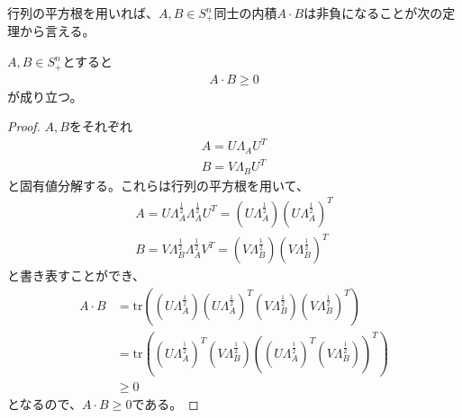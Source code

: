 行列の平方根を用いれば、$A, B \in S_+^n$同士の内積$A \cdot B$は非負になることが次の定理から言える。
\begin{theorem} \label{SemidefiniteInnerProduct}
  $A, B \in S_+^n$とすると
  \begin{align*}
    A \cdot B \geq 0
  \end{align*}
  が成り立つ。
\end{theorem}
\begin{proof}
  $A, B$をそれぞれ
  \begin{align*}
    A = U \Lambda_A U^T \\
    B = V \Lambda_B U^T
  \end{align*}
  と固有値分解する。これらは行列の平方根を用いて、
  \begin{align*}
    A = U \Lambda_A^\frac{1}{2} \Lambda_A^\frac{1}{2} U^T = \left(U \Lambda_A^\frac{1}{2}\right) \left(U \Lambda_A^\frac{1}{2}\right)^T\\
    B = V \Lambda_B^\frac{1}{2} \Lambda_A^\frac{1}{2} V^T = \left(V \Lambda_B^\frac{1}{2}\right) \left(V \Lambda_B^\frac{1}{2}\right)^T
  \end{align*}
  と書き表すことができ、
  \begin{align*}
    A \cdot B & = \mathrm{tr}\left(\left(U \Lambda_A^\frac{1}{2}\right) \left(U \Lambda_A^\frac{1}{2}\right)^T \left(V \Lambda_B^\frac{1}{2}\right) \left(V \Lambda_B^\frac{1}{2}\right)^T\right) \\
              & = \mathrm{tr}\left(\left(U \Lambda_A^\frac{1}{2}\right)^T \left(V \Lambda_B^\frac{1}{2}\right) \left(\left(U \Lambda_A^\frac{1}{2}\right)^T \left(V \Lambda_B^\frac{1}{2}\right)\right)^T\right) \\
              & \geq 0
  \end{align*}
  となるので、$A \cdot B \geq 0$である。
\end{proof}
